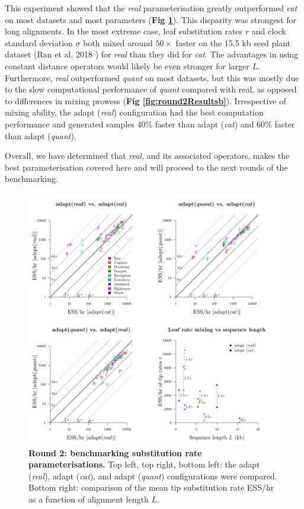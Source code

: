\documentclass[10pt,letterpaper]{article}
\begin{document}
This experiment showed that the \textit{real} parameterisation greatly outperformed \textit{cat} on most datasets and most parameters (\textbf{Fig \ref{fig:round2Results}}).
This disparity was strongest for long alignments.
In the most extreme case, leaf substitution rates $r$ and clock standard deviation $\sigma$ both mixed around $50\times$ faster on the 15.5 kb seed plant dataset (Ran et al. 2018 \cite{Ran_2018}) for \textit{real} than they did for \textit{cat}.
The advantages in using constant distance operators would likely be even stronger for larger $L$.
Furthermore, \textit{real} outperformed \textit{quant} on most datasets, but this was mostly due to the slow computational performance of \textit{quant} compared with real, as opposed to differences in mixing prowess (\textbf{Fig \ref{fig:round2Resultsb}}).
Irrespective of mixing ability, the adapt (\textit{real}) configuration had the best computation performance and generated samples 40\% faster than adapt (\textit{cat}) and 60\% faster than adapt (\textit{quant}).


Overall, we have determined that \textit{real}, and its associated operators, makes the best parameterisation covered here and will proceed to the next rounds of the benchmarking.



\begin{figure}[!h]
\includegraphics[width=\textwidth]{benchmarking/benchmarkingVM/ESS_round2.pdf}
\caption{\textbf{Round 2: benchmarking substitution rate parameterisations.} Top left, top right, bottom left: the adapt (\textit{real}), adapt (\textit{cat}), and adapt (\textit{quant}) configurations were compared. Bottom right: comparison of the mean tip substitution rate ESS/hr as a function of alignment length $L$. }
\label{fig:round2Results}
\end{figure}
\end{document}
